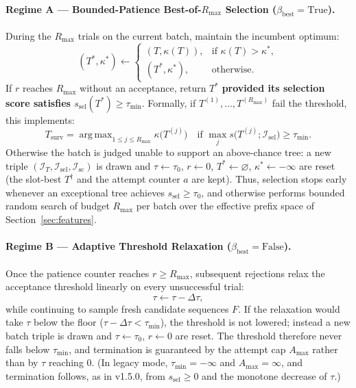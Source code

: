 \documentclass[11pt,a4paper]{article}
\DeclareMathOperator*{\argmax}{arg\,max}
\begin{document}
\paragraph{Regime A --- Bounded-Patience Best-of-$R_{\max}$ Selection ($\beta_{\text{best}} = \text{True}$).}
During the $R_{\max}$ trials on the current batch, maintain the incumbent optimum:
\begin{equation}
  (T^{\ast}, \kappa^{\ast}) \gets
  \begin{cases}
    (T, \kappa(T)), & \text{if } \kappa(T) > \kappa^{\ast}, \\
    (T^{\ast}, \kappa^{\ast}), & \text{otherwise.}
  \end{cases}
\end{equation}
If $r$ reaches $R_{\max}$ without an acceptance, return $T^*$ \textbf{provided its selection score satisfies $s_{\text{sel}}(T^*) \ge \tau_{\min}$}. Formally, if $T^{(1)}, \dots, T^{(R_{\max})}$ fail the threshold, this implements:
\begin{equation}
  T_{\text{surv}} = \argmax_{1 \le j \le R_{\max}} \kappa\big(T^{(j)}\big)
  \quad \text{if } \max_{j} s\big(T^{(j)}; \mathcal{I}_{\text{sel}}\big) \ge \tau_{\min}.
\end{equation}
Otherwise the batch is judged unable to support an above-chance tree: a new triple $(\mathcal{I}_T, \mathcal{I}_{\text{sel}}, \mathcal{I}_{\text{sc}})$ is drawn and $\tau \gets \tau_0$, $r \gets 0$, $T^* \gets \varnothing$, $\kappa^* \gets -\infty$ are reset (the slot-best $T^{\dagger}$ and the attempt counter $a$ are kept). Thus, selection stops early whenever an exceptional tree achieves $s_{\text{sel}} \ge \tau_0$, and otherwise performs bounded random search of budget $R_{\max}$ per batch over the effective prefix space of Section~\ref{sec:features}.

\paragraph{Regime B --- Adaptive Threshold Relaxation ($\beta_{\text{best}} = \text{False}$).}
Once the patience counter reaches $r \ge R_{\max}$, subsequent rejections relax the acceptance threshold linearly on every unsuccessful trial:
\begin{equation}
  \tau \gets \tau - \Delta\tau,
\end{equation}
while continuing to sample fresh candidate sequences $F$. If the relaxation would take $\tau$ below the floor ($\tau - \Delta\tau < \tau_{\min}$), the threshold is not lowered; instead a new batch triple is drawn and $\tau \gets \tau_0$, $r \gets 0$ are reset. The threshold therefore never falls below $\tau_{\min}$, and termination is guaranteed by the attempt cap $A_{\max}$ rather than by $\tau$ reaching $0$. (In legacy mode, $\tau_{\min} = -\infty$ and $A_{\max} = \infty$, and termination follows, as in v1.5.0, from $s_{\text{sel}} \ge 0$ and the monotone decrease of $\tau$.)
\end{document}
